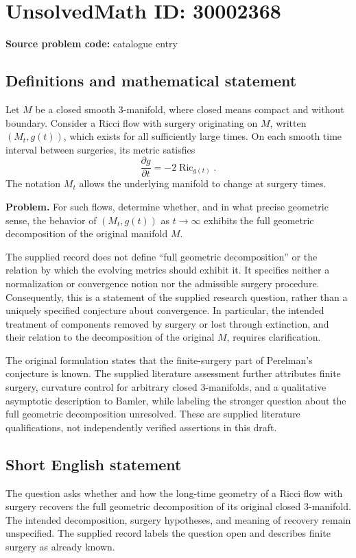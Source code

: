\documentclass[11pt]{article}
\begin{document}
\section*{UnsolvedMath ID: 30002368}
\textbf{Source problem code:} catalogue entry
\subsection{Definitions and mathematical statement}
Let \(M\) be a closed smooth \(3\)-manifold, where closed means compact and without boundary. Consider a Ricci flow with surgery originating on \(M\), written \((M_t,g(t))\), which exists for all sufficiently large times. On each smooth time interval between surgeries, its metric satisfies
\[
\frac{\partial g}{\partial t}=-2\operatorname{Ric}_{g(t)}.
\]
The notation \(M_t\) allows the underlying manifold to change at surgery times.

\textbf{Problem.} For such flows, determine whether, and in what precise geometric sense, the behavior of \((M_t,g(t))\) as \(t\to\infty\) exhibits the full geometric decomposition of the original manifold \(M\).

The supplied record does not define ``full geometric decomposition'' or the relation by which the evolving metrics should exhibit it. It specifies neither a normalization or convergence notion nor the admissible surgery procedure. Consequently, this is a statement of the supplied research question, rather than a uniquely specified conjecture about convergence. In particular, the intended treatment of components removed by surgery or lost through extinction, and their relation to the decomposition of the original \(M\), requires clarification.

The original formulation states that the finite-surgery part of Perelman's conjecture is known. The supplied literature assessment further attributes finite surgery, curvature control for arbitrary closed \(3\)-manifolds, and a qualitative asymptotic description to Bamler, while labeling the stronger question about the full geometric decomposition unresolved. These are supplied literature qualifications, not independently verified assertions in this draft.
\subsection{Short English statement}
The question asks whether and how the long-time geometry of a Ricci flow with surgery recovers the full geometric decomposition of its original closed \(3\)-manifold. The intended decomposition, surgery hypotheses, and meaning of recovery remain unspecified. The supplied record labels the question open and describes finite surgery as already known.
\end{document}
